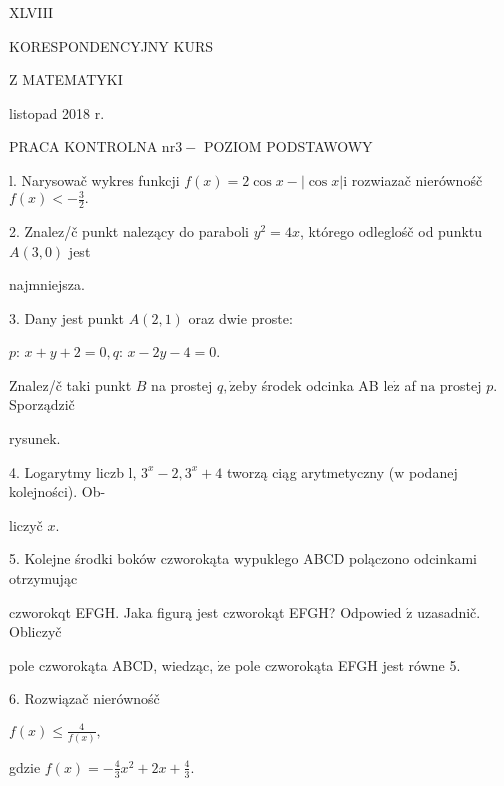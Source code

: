 \documentclass[a4paper,12pt]{article}
\begin{document}
XLVIII

KORESPONDENCYJNY KURS

Z MATEMATYKI

listopad 2018 r.

PRACA KONTROLNA $\mathrm{n}\mathrm{r} 3-$ POZIOM PODSTAWOWY

l. Narysowač wykres funkcji $f(x)=2\cos x-|\cos x|\mathrm{i}$ rozwiazač nierównośč $f(x)<-\displaystyle \frac{3}{2}.$

2. Znalez/č punkt nalezący do paraboli $y^{2}=4x$, którego odleglośč od punktu $A(3,0)$ jest

najmniejsza.

3. Dany jest punkt $A(2,1)$ oraz dwie proste:

$p$: $x+y+2=0, q$: $x-2y-4=0.$

Znalez/č taki punkt $B$ na prostej $q, \dot{\mathrm{z}}\mathrm{e}\mathrm{b}\mathrm{y}$ środek odcinka AB $\mathrm{l}\mathrm{e}\dot{\mathrm{z}}$ af $\mathrm{n}\mathrm{a}$ prostej $p$. Sporządzič

rysunek.

4. Logarytmy liczb l, $3^{x}-2, 3^{x}+4$ tworzą ciąg arytmetyczny ($\mathrm{w}$ podanej kolejności). Ob-

liczyč $x.$

5. Kolejne środki boków czworokąta wypuklego ABCD polączono odcinkami otrzymując

czworokqt EFGH. Jaka figurą jest czworokąt EFGH? Odpowied $\acute{\mathrm{z}}$ uzasadnič. Obliczyč

pole czworokąta ABCD, wiedząc, $\dot{\mathrm{z}}\mathrm{e}$ pole czworokąta EFGH jest równe 5.

6. Rozwiązač nierównośč

$f(x)\displaystyle \leq\frac{4}{f(x)},$

gdzie $f(x)=-\displaystyle \frac{4}{3}x^{2}+2x+\frac{4}{3}.$
\end{document}

